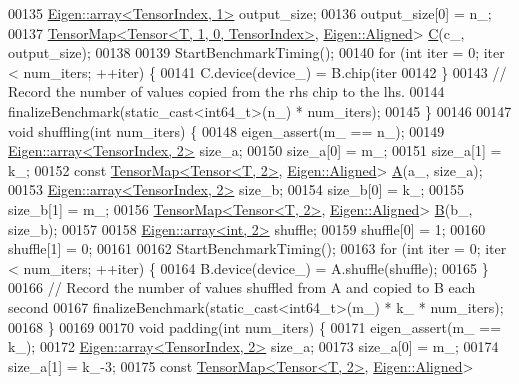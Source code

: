 \begin{DoxyCode}
00135     \hyperlink{class_eigen_1_1array}{Eigen::array<TensorIndex, 1>} output\_size;
00136     output\_size[0] = n\_;
00137     \hyperlink{class_eigen_1_1_tensor_map}{TensorMap<Tensor<T, 1, 0, TensorIndex>}, 
      \hyperlink{group__enums_gga45fe06e29902b7a2773de05ba27b47a1ad37d4c71425bb286e9b4103830538fbf}{Eigen::Aligned}> \hyperlink{group___core___module}{C}(c\_, output\_size);
00138 
00139     StartBenchmarkTiming();
00140     \textcolor{keywordflow}{for} (\textcolor{keywordtype}{int} iter = 0; iter < num\_iters; ++iter) \{
00141       C.device(device\_) = B.chip(iter %
00142     \}
00143     \textcolor{comment}{// Record the number of values copied from the rhs chip to the lhs.}
00144     finalizeBenchmark(static\_cast<int64\_t>(n\_) * num\_iters);
00145   \}
00146 
00147   \textcolor{keywordtype}{void} shuffling(\textcolor{keywordtype}{int} num\_iters) \{
00148     eigen\_assert(m\_ == n\_);
00149     \hyperlink{class_eigen_1_1array}{Eigen::array<TensorIndex, 2>} size\_a;
00150     size\_a[0] = m\_;
00151     size\_a[1] = k\_;
00152     \textcolor{keyword}{const} \hyperlink{class_eigen_1_1_tensor_map}{TensorMap<Tensor<T, 2>}, \hyperlink{group__enums_gga45fe06e29902b7a2773de05ba27b47a1ad37d4c71425bb286e9b4103830538fbf}{Eigen::Aligned}> 
      \hyperlink{group___core___module_class_eigen_1_1_matrix}{A}(a\_, size\_a);
00153     \hyperlink{class_eigen_1_1array}{Eigen::array<TensorIndex, 2>} size\_b;
00154     size\_b[0] = k\_;
00155     size\_b[1] = m\_;
00156     \hyperlink{class_eigen_1_1_tensor_map}{TensorMap<Tensor<T, 2>}, \hyperlink{group__enums_gga45fe06e29902b7a2773de05ba27b47a1ad37d4c71425bb286e9b4103830538fbf}{Eigen::Aligned}> 
      \hyperlink{group___core___module_class_eigen_1_1_matrix}{B}(b\_, size\_b);
00157 
00158     \hyperlink{class_eigen_1_1array}{Eigen::array<int, 2>} shuffle;
00159     shuffle[0] = 1;
00160     shuffle[1] = 0;
00161 
00162     StartBenchmarkTiming();
00163     \textcolor{keywordflow}{for} (\textcolor{keywordtype}{int} iter = 0; iter < num\_iters; ++iter) \{
00164       B.device(device\_) = A.shuffle(shuffle);
00165     \}
00166     \textcolor{comment}{// Record the number of values shuffled from A and copied to B each second}
00167     finalizeBenchmark(static\_cast<int64\_t>(m\_) * k\_ * num\_iters);
00168   \}
00169 
00170  \textcolor{keywordtype}{void} padding(\textcolor{keywordtype}{int} num\_iters) \{
00171     eigen\_assert(m\_ == k\_);
00172     \hyperlink{class_eigen_1_1array}{Eigen::array<TensorIndex, 2>} size\_a;
00173     size\_a[0] = m\_;
00174     size\_a[1] = k\_-3;
00175     \textcolor{keyword}{const} \hyperlink{class_eigen_1_1_tensor_map}{TensorMap<Tensor<T, 2>}, \hyperlink{group__enums_gga45fe06e29902b7a2773de05ba27b47a1ad37d4c71425bb286e9b4103830538fbf}{Eigen::Aligned}> 

\end{DoxyCode}
